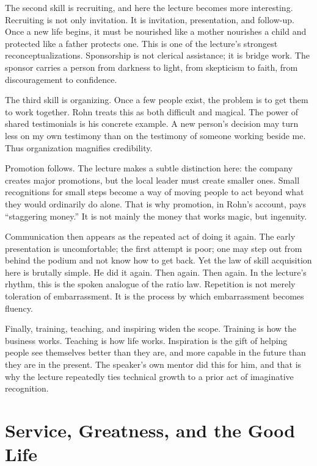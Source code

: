 The second skill is recruiting, and here the lecture becomes more interesting. Recruiting is not only invitation. It is invitation, presentation, and follow-up. Once a new life begins, it must be nourished like a mother nourishes a child and protected like a father protects one. This is one of the lecture's strongest reconceptualizations. Sponsorship is not clerical assistance; it is bridge work. The sponsor carries a person from darkness to light, from skepticism to faith, from discouragement to confidence.

The third skill is organizing. Once a few people exist, the problem is to get them to work together. Rohn treats this as both difficult and magical. The power of shared testimonials is his concrete example. A new person's decision may turn less on my own testimony than on the testimony of someone working beside me. Thus organization magnifies credibility.

Promotion follows. The lecture makes a subtle distinction here: the company creates major promotions, but the local leader must create smaller ones. Small recognitions for small steps become a way of moving people to act beyond what they would ordinarily do alone. That is why promotion, in Rohn's account, pays ``staggering money.'' It is not mainly the money that works magic, but ingenuity.

Communication then appears as the repeated act of doing it again. The early presentation is uncomfortable; the first attempt is poor; one may step out from behind the podium and not know how to get back. Yet the law of skill acquisition here is brutally simple. He did it again. Then again. Then again. In the lecture's rhythm, this is the spoken analogue of the ratio law. Repetition is not merely toleration of embarrassment. It is the process by which embarrassment becomes fluency.

Finally, training, teaching, and inspiring widen the scope. Training is how the business works. Teaching is how life works. Inspiration is the gift of helping people see themselves better than they are, and more capable in the future than they are in the present. The speaker's own mentor did this for him, and that is why the lecture repeatedly ties technical growth to a prior act of imaginative recognition.

\section{Service, Greatness, and the Good Life}

